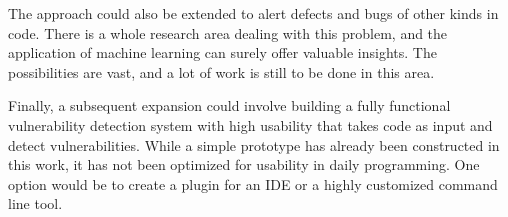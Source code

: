 The approach could also be extended to alert defects and bugs of other kinds in code. There is a whole research area dealing with this problem, and the application of machine learning can surely offer valuable insights. The possibilities are vast, and a lot of work is still to be done in this area.

Finally, a subsequent expansion could involve building a fully functional vulnerability detection system with high usability that takes code as input and detect vulnerabilities. While a simple prototype has already been constructed in this work, it has not been optimized for usability in daily programming. One option would be to create a plugin for an IDE or a highly customized command line tool.

